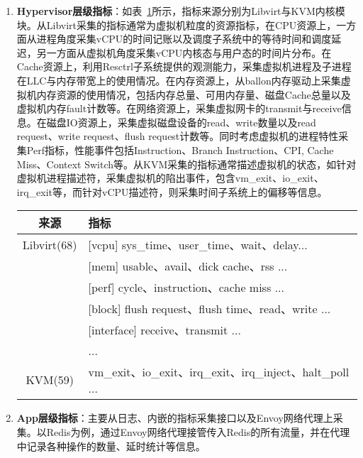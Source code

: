 \begin{enumerate}
    \item \textbf{Hypervisor层级指标}：如表~\ref{tab:hypervisor_metric}所示，指标来源分别为Libvirt与KVM内核模块。从Libvirt采集的指标通常为虚拟机粒度的资源指标，在CPU资源上，一方面从进程角度采集vCPU的时间记账以及调度子系统中的等待时间和调度延迟，另一方面从虚拟机角度采集vCPU内核态与用户态的时间片分布。在Cache资源上，利用Resctrl子系统提供的观测能力，采集虚拟机进程及子进程在LLC与内存带宽上的使用情况。在内存资源上，从ballon内存驱动上采集虚拟机内存资源的使用情况，包括内存总量、可用内存量、磁盘Cache总量以及虚拟机内存fault计数等。在网络资源上，采集虚拟网卡的transmit与receive信息。在磁盘IO资源上，采集虚拟磁盘设备的read、write数量以及read request、write request、flush request计数等。同时考虑虚拟机的进程特性采集Perf指标，性能事件包括Instruction、Branch Instruction、CPI, Cache Miss、Context Switch等。从KVM采集的指标通常描述虚拟机的状态，如针对虚拟机进程描述符，采集虚拟机的陷出事件，包含vm\_exit、io\_exit、irq\_exit等，而针对vCPU描述符，则采集时间子系统上的偏移等信息。

\begin{table}[!htbp]
    \label{tab:hypervisor_metric}
    \footnotesize%
    \setlength{\tabcolsep}{4pt}%
    \renewcommand{\arraystretch}{1.25}%
    \centering
    \begin{tabular}{cl}
        \hline
        来源 & 指标\\
        \hline
        Libvirt(68) & [vcpu] sys\_time、user\_time、wait、delay...\\
        & [mem] usable、avail、dick cache、rss ...\\
        & [perf] cycle、instruction、cache miss ...\\
        & [block] flush request、flush time、read、write ...\\
        & [interface] receive、transmit ...\\
        & ...\\
        KVM(59) & vm\_exit、io\_exit、irq\_exit、irq\_inject、halt\_poll ...\\
        \hline
    \end{tabular}
\end{table}

    \item \textbf{App层级指标}：主要从日志、内嵌的指标采集接口以及Envoy网络代理上采集。以Redis为例，通过Envoy网络代理接管传入Redis的所有流量，并在代理中记录各种操作的数量、延时统计等信息。
    
\end{enumerate}

